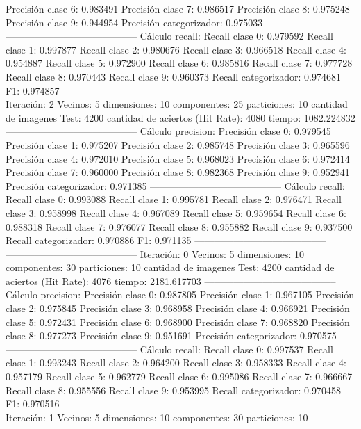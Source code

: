 Precisión clase 6: 0.983491
Precisión clase 7: 0.986517
Precisión clase 8: 0.975248
Precisión clase 9: 0.944954
Precisión categorizador: 0.975033
-----------------------------------------
Cálculo recall: 
Recall clase 0: 0.979592
Recall clase 1: 0.997877
Recall clase 2: 0.980676
Recall clase 3: 0.966518
Recall clase 4: 0.954887
Recall clase 5: 0.972900
Recall clase 6: 0.985816
Recall clase 7: 0.977728
Recall clase 8: 0.970443
Recall clase 9: 0.960373
Recall categorizador: 0.974681
F1: 0.974857
-----------------------------------------
-----------------------------------------
Iteración: 2
Vecinos: 5
dimensiones: 10
componentes: 25
particiones: 10
cantidad de imagenes Test: 4200
cantidad de aciertos (Hit Rate): 4080
tiempo: 1082.224832
-----------------------------------------
Cálculo precision: 
Precisión clase 0: 0.979545
Precisión clase 1: 0.975207
Precisión clase 2: 0.985748
Precisión clase 3: 0.965596
Precisión clase 4: 0.972010
Precisión clase 5: 0.968023
Precisión clase 6: 0.972414
Precisión clase 7: 0.960000
Precisión clase 8: 0.982368
Precisión clase 9: 0.952941
Precisión categorizador: 0.971385
-----------------------------------------
Cálculo recall: 
Recall clase 0: 0.993088
Recall clase 1: 0.995781
Recall clase 2: 0.976471
Recall clase 3: 0.958998
Recall clase 4: 0.967089
Recall clase 5: 0.959654
Recall clase 6: 0.988318
Recall clase 7: 0.976077
Recall clase 8: 0.955882
Recall clase 9: 0.937500
Recall categorizador: 0.970886
F1: 0.971135
-----------------------------------------
-----------------------------------------
Iteración: 0
Vecinos: 5
dimensiones: 10
componentes: 30
particiones: 10
cantidad de imagenes Test: 4200
cantidad de aciertos (Hit Rate): 4076
tiempo: 2181.617703
-----------------------------------------
Cálculo precision: 
Precisión clase 0: 0.987805
Precisión clase 1: 0.967105
Precisión clase 2: 0.975845
Precisión clase 3: 0.968958
Precisión clase 4: 0.966921
Precisión clase 5: 0.972431
Precisión clase 6: 0.968900
Precisión clase 7: 0.968820
Precisión clase 8: 0.977273
Precisión clase 9: 0.951691
Precisión categorizador: 0.970575
-----------------------------------------
Cálculo recall: 
Recall clase 0: 0.997537
Recall clase 1: 0.993243
Recall clase 2: 0.964200
Recall clase 3: 0.958333
Recall clase 4: 0.957179
Recall clase 5: 0.962779
Recall clase 6: 0.995086
Recall clase 7: 0.966667
Recall clase 8: 0.955556
Recall clase 9: 0.953995
Recall categorizador: 0.970458
F1: 0.970516
-----------------------------------------
-----------------------------------------
Iteración: 1
Vecinos: 5
dimensiones: 10
componentes: 30
particiones: 10

